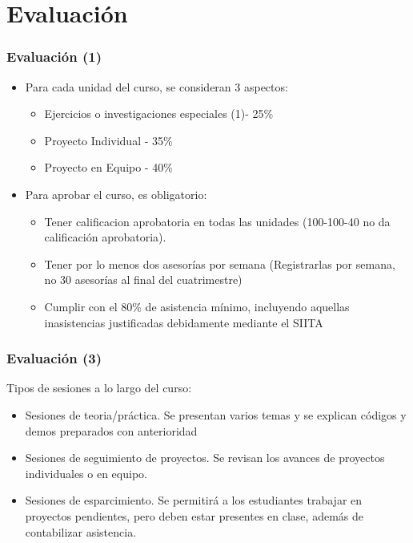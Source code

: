 \section{Evaluación}

\begin{frame}
\frametitle{Evaluación (1)}
\begin{itemize}
\item Para cada unidad del curso, se consideran 3 aspectos:
\begin{itemize}
\item Ejercicios o investigaciones especiales (1)- 25\%
\item Proyecto Individual  - 35\%
\item Proyecto en Equipo - 40\%
\end{itemize}
\item Para aprobar el curso, es obligatorio:
\begin{itemize} 
\item Tener calificacion aprobatoria en todas las unidades (100-100-40 no da calificación aprobatoria).
\item Tener por lo menos dos asesorías por semana (Registrarlas por semana, no 30 asesorías al final del cuatrimestre)
\item Cumplir con el 80\% de asistencia mínimo, incluyendo aquellas inasistencias justificadas debidamente mediante el SIITA
\end{itemize}
\end{itemize}
\end{frame}

\begin{frame}
\frametitle{Evaluación (3)}
Tipos de sesiones a lo largo del curso:
\begin{itemize}
\item Sesiones de teoria/práctica. Se presentan varios temas y se explican códigos y demos preparados con anterioridad
\item Sesiones de seguimiento de proyectos. Se revisan los avances de proyectos individuales o en equipo.
\item Sesiones de esparcimiento. Se permitirá a los estudiantes trabajar en proyectos pendientes, pero deben estar presentes en clase, además de contabilizar asistencia. 
\end{itemize}
\end{frame}


